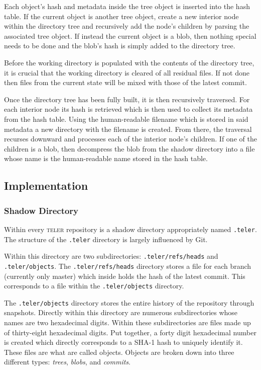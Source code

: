 \documentclass[12pt, letterpaper]{article}
\begin{document}
\begin{multicols}{2}
  Each object's hash and metadata inside the tree object is inserted
  into the hash table. If the current object is another tree object,
  create a new interior node within the directory tree and recursively
  add the node's children by parsing the associated tree object. If
  instead the current object is a blob, then nothing special needs to
  be done and the blob's hash is simply added to the directory tree.

  Before the working directory is populated with the contents of the
  directory tree, it is crucial that the working directory is cleared
  of all residual files. If not done then files from the current state
  will be mixed with those of the latest commit.

  Once the directory tree has been fully built, it is then recursively
  traversed. For each interior node its hash is retrieved which is
  then used to collect its metadata from the hash table. Using the
  human-readable filename which is stored in said metadata a new
  directory with the filename is created. From there, the traversal
  recurses downward and processes each of the interior node's
  children. If one of the children is a blob, then decompress the blob
  from the shadow directory into a file whose name is the
  human-readable name stored in the hash table.

  \subsection{Implementation}
  \label{sec:implementation}

  \subsubsection{Shadow Directory}
  \label{subsubsec:shadowdir}
  Within every \textsc{teler} repository is a shadow directory
  appropriately named \texttt{.teler}. The structure of the
  \texttt{.teler} directory is largely influenced by Git.

  Within this directory are two subdirectories:
  \texttt{.teler/refs/heads} and \texttt{.teler/objects}. The
  \texttt{.teler/refs/heads} directory stores a file for each branch
  (currently only master) which inside holds the hash of the latest
  commit. This corresponds to a file within the
  \texttt{.teler/objects} directory.

  The \texttt{.teler/objects} directory stores the entire history of
  the repository through snapshots. Directly within this directory are
  numerous subdirectories whose names are two hexadecimal digits.
  Within these subdirectories are files made up of thirty-eight
  hexadecimal digits. Put together, a forty digit hexadecimal number
  is created which directly corresponds to a SHA-1 hash to uniquely
  identify it. These files are what are called objects. Objects are
  broken down into three different types: \textit{trees},
  \textit{blobs}, and \textit{commits}.


\end{multicols}
\end{document}
